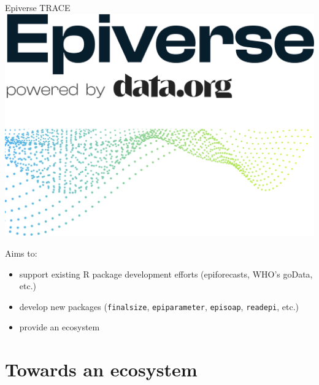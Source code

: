 \documentclass[10pt]{beamer}
\begin{document}
\begin{frame}[fragile]{Epiverse TRACE}
\includegraphics[scale=0.25]{../figures/Epiverse-RGB.png}

Aims to:

\begin{itemize}
\item support existing R package development efforts (epiforecasts, WHO's goData, etc.)
\item develop new packages (\texttt{finalsize}, \texttt{epiparameter}, \texttt{episoap}, \texttt{readepi}, etc.)
\item provide an ecosystem 
\end{itemize} 
\end{frame}



\section{Towards an ecosystem}
\end{document}
